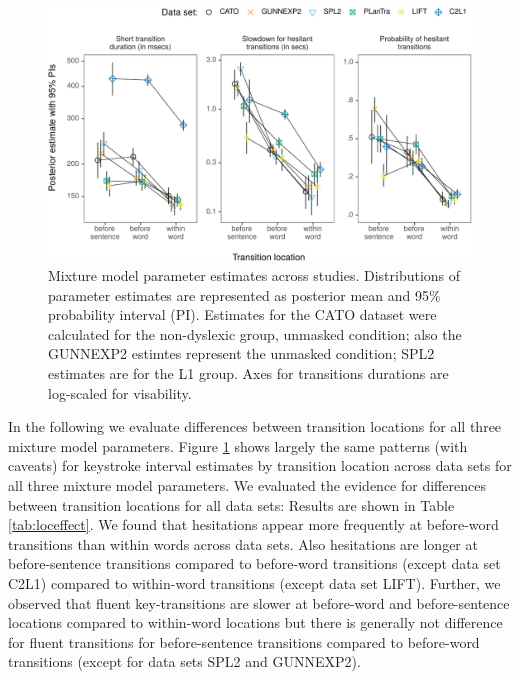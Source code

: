 \documentclass[
  english,
  man,floatsintext]{apa7}
\begin{document}
\begin{figure}

{\centering \includegraphics{manuscript_files/figure-latex/crossstudypost-1} 

}

\caption{Mixture model parameter estimates across studies. Distributions of parameter estimates are represented as posterior mean and 95\% probability interval (PI). Estimates for the CATO dataset were calculated for the non-dyslexic group, unmasked condition; also the GUNNEXP2 estimtes represent the unmasked condition; SPL2 estimates are for the L1 group. Axes for transitions durations are log-scaled for visability.}\label{fig:crossstudypost}
\end{figure}

In the following we evaluate differences between transition locations for all three mixture model parameters. Figure \ref{fig:crossstudypost} shows largely the same patterns (with caveats) for keystroke interval estimates by transition location across data sets for all three mixture model parameters. We evaluated the evidence for differences between transition locations for all data sets: Results are shown in Table \ref{tab:loceffect}. We found that hesitations appear more frequently at before-word transitions than within words across data sets. Also hesitations are longer at before-sentence transitions compared to before-word transitions (except data set C2L1) compared to within-word transitions (except data set LIFT). Further, we observed that fluent key-transitions are slower at before-word and before-sentence locations compared to within-word locations but there is generally not difference for fluent transitions for before-sentence transitions compared to before-word transitions (except for data sets SPL2 and GUNNEXP2).
\end{document}
